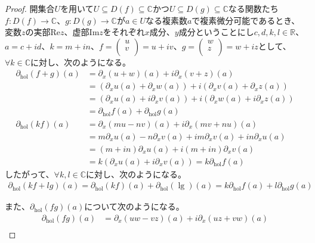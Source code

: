 \documentclass[dvipdfmx]{jsarticle}
\begin{document}
\begin{proof}
開集合$U$を用いて$U \subseteq D(f) \subseteq \mathbb{C}$かつ$U \subseteq D(g) \subseteq \mathbb{C}$なる関数たち$f:D(f) \rightarrow \mathbb{C}$、$g:D(g) \rightarrow \mathbb{C}$が$a \in U$なる複素数$a$で複素微分可能であるとき、変数$z$の実部$\mathrm{Re}z$、虚部$\mathrm{Im}z$をそれぞれ$x$成分、$y$成分ということにし$c,d,k,l \in \mathbb{R}$、$a = c + id$、$k = m + in$、$f = \begin{pmatrix}
u \\
v \\
\end{pmatrix} = u + iv$、$g = \begin{pmatrix}
w \\
z \\
\end{pmatrix} = w + iz$として、$\forall k \in \mathbb{C}$に対し、次のようになる。
\begin{align*}
\partial_{\mathrm{hol}}(f + g)(a) &= \partial_{x}(u + w)(a) + i\partial_{x}(v + z)(a)\\
&= \left( \partial_{x}u(a) + \partial_{x}w(a) \right) + i\left( \partial_{x}v(a) + \partial_{x}z(a) \right)\\
&= \left( \partial_{x}u(a) + i\partial_{x}v(a) \right) + i\left( \partial_{x}w(a) + i\partial_{x}z(a) \right)\\
&= \partial_{\mathrm{hol}}f(a) + \partial_{\mathrm{hol}}g(a)\\
\partial_{\mathrm{hol}}(kf)(a) &= \partial_{x}(mu - nv)(a) + i\partial_{x}(mv + nu)(a)\\
&= m\partial_{x}u(a) - n\partial_{x}v(a) + im\partial_{x}v(a) + in\partial_{x}u(a)\\
&= (m + in)\partial_{x}u(a) + i(m + in)\partial_{x}v(a)\\
&= k\left( \partial_{x}u(a) + i\partial_{x}v(a) \right) = k\partial_{\mathrm{hol}}f(a)
\end{align*}
したがって、$\forall k,l \in \mathbb{C}$に対し、次のようになる。
\begin{align*}
\partial_{\mathrm{hol}}(kf + lg)(a) = \partial_{\mathrm{hol}}(kf)(a) + \partial_{\mathrm{hol}}\left( \lg \right)(a) = k\partial_{\mathrm{hol}}f(a) + l\partial_{\mathrm{hol}}g(a)
\end{align*}\par
また、$\partial_{\mathrm{hol}}(fg)(a)$について次のようになる。
\begin{align*}
\partial_{\mathrm{hol}}(fg)(a) &= \partial_{x}(uw - vz)(a) + i\partial_{x}(uz + vw)(a)\\

\end{align*}
\end{proof}
\end{document}
